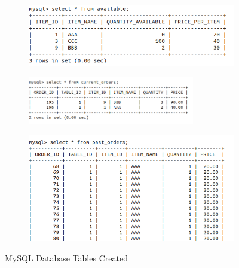 \documentclass[12pt,a4paper]{article}
\begin{document}
\begin{figure}[h]
\begin{subfigure}{.5\textwidth}
	\end{subfigure}%
	\begin{subfigure}{.5\textwidth}
		\centering
		\includegraphics[width=1\textwidth]{available_table}
	\end{subfigure}
	\begin{subfigure}{.5\textwidth}
		\centering
		\includegraphics[width=0.8\textwidth]{current_orders}
	\end{subfigure}%
	\begin{subfigure}{.5\textwidth}
		\centering
		\includegraphics[width=1\textwidth]{past_orders}
	\end{subfigure}
	\caption[short]{MySQL Database Tables Created}
\end{figure}		    	
	    
	    

		

	\newpage
	\nocite{*}	
	
	
\end{document}
